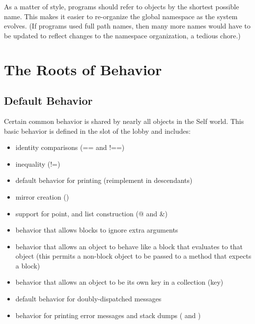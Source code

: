 \documentclass[letterpaper,10pt,english]{sphinxmanual}
\begin{document}
As a matter of style, programs should refer to objects by the shortest possible name. This makes it
easier to re-organize the global namespace as the system evolves. (If programs used full path
names, then many more names would have to be updated to reflect changes to the namespace organization,
a tedious chore.)


\section{The Roots of Behavior}
\label{\detokenize{roots::doc}}\label{\detokenize{roots:the-roots-of-behavior}}

\subsection{Default Behavior}
\label{\detokenize{roots:default-behavior}}
Certain common behavior is shared by nearly all objects in the Self world. This basic behavior is
defined in the  slot of the lobby and includes:
\begin{itemize}
\item {} 
identity comparisons (== and !==)

\item {} 
inequality (!=)

\item {} 
default behavior for printing (reimplement  in descendants)

\item {} 
mirror creation ()

\item {} 
support for point, and list construction (@ and \&)

\item {} 
behavior that allows blocks to ignore extra arguments

\item {} 
behavior that allows an object to behave like a block that evaluates to that object (this permits a non-block object to be passed to a method that expects a block)

\item {} 
behavior that allows an object to be its own key in a collection (key)

\item {} 
default behavior for doubly-dispatched messages

\item {} 
behavior for printing error messages and stack dumps ( and )

\end{itemize}
\end{document}
